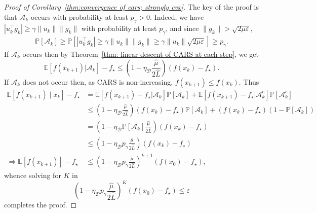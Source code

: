 \begin{proof}[Proof of Corollary~\ref{thm:convergence of cars; strongly cvx}]
    The key of the proof is that $\mathcal{A}_k$ occurs with probability at least $p_{\gamma} > 0$. Indeed, we have  $|u_k^{\top}g_k| \geq \gamma\|u_k\|\|g_k\|$ with probability at least $p_{\gamma}$, and since $\|g_k\| > \sqrt{2\mu\varepsilon}$,
    \begin{align*}
        \mathbb{P}[\mathcal{A}_k] \geq
        \mathbb{P}\left[|u_{k}^{\top} g_{k}| \geq \gamma \|u_k\| \|g_k\| \geq  \gamma \|u_k\| \sqrt{2\mu\varepsilon}\right] \geq p_{\gamma}.
    \end{align*}
    If $\mathcal{A}_k$ occurs then by Theorem~\ref{thm: linear descent of CARS at each step}, we get
    \begin{equation*}
        \mathbb{E}[f(x_{k+1})|\mathcal{A}_k] - f_{\star} \leq \left(1-\eta_{\mathcal{D}}\frac{\hat{\mu}}{2\hat{L}}\right)(f(x_k)-f_{\star}).
    \end{equation*}
    If $\mathcal{A}_k$ does not occur then, as CARS is non-increasing, $f(x_{k+1}) \leq f(x_k)$. Thus
    \begin{align*}
        \mathbb{E}\left[f(x_{k+1}) \mid x_k \right] - f_{\star} & = \mathbb{E}[f(x_{k+1})- f_{\star}|\mathcal{A}_k]\mathbb{P}[\mathcal{A}_k] + \mathbb{E}[f(x_{k+1})- f_{\star}|\mathcal{A}_k^{c}]\mathbb{P}[\mathcal{A}_k^{c}]                           \\
                                                                & \leq \left(1-\eta_{\mathcal{D}}\frac{\hat{\mu}}{2\hat{L}}\right)(f(x_k)-f_{\star})\mathbb{P}[\mathcal{A}_k] + \left(f(x_k) - f_{\star}\right)\left(1 - \mathbb{P}[\mathcal{A}_k]\right) \\
                                                                & = \left(1-\eta_{\mathcal{D}}
        \mathbb{P}[\mathcal{A}_k]\frac{\hat{\mu}}{2\hat{L}}\right)(f(x_k)-f_{\star})                                                                                                                                                                      \\
                                                                & \leq \left(1-\eta_{\mathcal{D}} p_{\gamma}\frac{\hat{\mu}}{2\hat{L}}\right)(f(x_k)-f_{\star})                                                                                           \\
        \Rightarrow  \mathbb{E}[f(x_{k+1})] - f_{\star}         & \leq \left(1-\eta_{\mathcal{D}}p_{\gamma}\frac{\hat{\mu}}{2\hat{L}}\right)^{k+1}(f(x_0)-f_{\star}),
    \end{align*}
    whence solving for $K$ in
    \begin{equation}
        \left(1-\eta_{\mathcal{D}}p_{\gamma}\frac{\hat{\mu}}{2\hat{L}}\right)^{K}(f(x_0)-f_{\star}) \leq \varepsilon
    \end{equation}
    completes the proof.
\end{proof}




